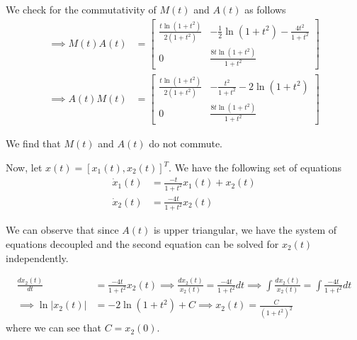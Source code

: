 We check for the commutativity of \( M(t) \) and \( A(t) \) as follows
\begin{align*}
    \implies
    M(t) A(t)
     & =
    \begin{bmatrix}
        \frac{t \ln(1+t^2)}{2(1+t^2)} & -\frac{1}{2} \ln(1+t^2) - \frac{4t^2}{1+t^2} \\
        0                             & \frac{8t \ln(1+t^2)}{1+t^2}
    \end{bmatrix}
    \\
    \implies
    A(t) M(t)
     & =
    \begin{bmatrix}
        \frac{t \ln(1+t^2)}{2(1+t^2)} & -\frac{t^2}{1+t^2} - 2 \ln(1+t^2) \\
        0                             & \frac{8t \ln(1+t^2)}{1+t^2}
    \end{bmatrix}
\end{align*}

We find that \( M(t) \) and \( A(t) \) do not commute.

\clearpage
Now, let \( x(t) = {[x_1(t), x_2(t)]}^T \).
We have the following set of equations
\begin{align*}
    \dot{x}_1(t)
     & =
    \frac{-t}{1+t^2} x_1(t) + x_2(t)
    \\
    \dot{x}_2(t)
     & =
    \frac{-4t}{1+t^2} x_2(t)
\end{align*}

We can observe that since \( A(t) \) is upper triangular, we have the system of equations decoupled and the second equation can be solved for \( x_2(t) \) independently.

\begin{align*}
    \frac{d x_2(t)}{dt}
     & =
    \frac{-4t}{1+t^2} x_2(t)
    \implies
    \frac{d x_2(t)}{x_2(t)}
    =
    \frac{-4t}{1+t^2} dt
    \implies
    \int \frac{d x_2(t)}{x_2(t)}
    =
    \int \frac{-4t}{1+t^2} dt
    \\
    \implies
    \ln \lvert x_2(t) \rvert
     & =
    -2 \ln(1+t^2) + C
    \implies
    x_2(t)
    =
    \frac{C}{{(1+t^2)}^2}
\end{align*}
where we can see that \( C = x_2(0) \).

